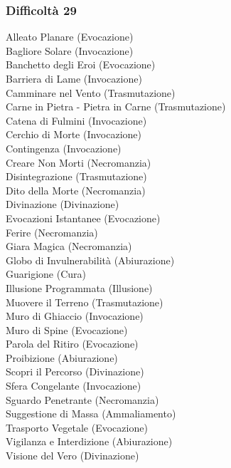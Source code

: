 \begin{multicols}{3}
	\subsubsection{Difficoltà 29}
	Alleato Planare (Evocazione)\\
	Bagliore Solare (Invocazione)\\
	Banchetto degli Eroi (Evocazione)\\
	Barriera di Lame (Invocazione)\\
	Camminare nel Vento (Trasmutazione)\\
	Carne in Pietra - Pietra in Carne (Trasmutazione)\\
	Catena di Fulmini (Invocazione)\\
	Cerchio di Morte (Invocazione)\\
	Contingenza (Invocazione)\\
	Creare Non Morti (Necromanzia)\\
	Disintegrazione (Trasmutazione)\\
	Dito della Morte (Necromanzia)\\
	Divinazione (Divinazione)\\
	Evocazioni Istantanee (Evocazione)\\
	Ferire (Necromanzia)\\
	Giara Magica (Necromanzia)\\
	Globo di Invulnerabilità (Abiurazione)\\
	Guarigione (Cura)\\
	Illusione Programmata (Illusione)\\
	Muovere il Terreno (Trasmutazione)\\
	Muro di Ghiaccio (Invocazione)\\
	Muro di Spine (Evocazione)\\
	Parola del Ritiro (Evocazione)\\
	Proibizione (Abiurazione)\\
	Scopri il Percorso (Divinazione)\\
	Sfera Congelante (Invocazione)\\
	Sguardo Penetrante (Necromanzia)\\
	Suggestione di Massa (Ammaliamento)\\
	Trasporto Vegetale (Evocazione)\\
	Vigilanza e Interdizione (Abiurazione)\\
	Visione del Vero (Divinazione)\\
	

\end{multicols}
